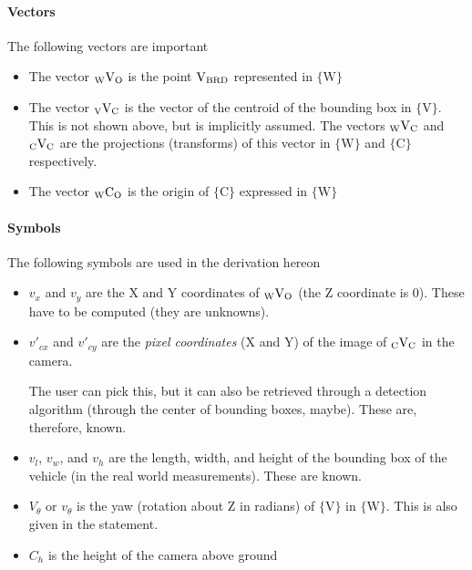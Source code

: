 \paragraph*{Vectors}

The following vectors are important

\begin{itemize}
    \item The vector $_{\textrm{W}}\textup{V}_{\textup{O}}$ is the point $\textup{V}_{\textup{BRD}}$ represented in $\{\textrm{W}\}$
    \item The vector $_{\textrm{V}}\textup{V}_{\textup{C}}$ is the vector of the centroid of the bounding box in $\{\textrm{V}\}$. This is not shown above, but is implicitly assumed. The vectors $_{\textrm{W}}\textup{V}_{\textup{C}}$ and $_{\textrm{C}}\textup{V}_{\textup{C}}$ are the projections (transforms) of this vector in $\{\textrm{W}\}$ and $\{\textrm{C}\}$ respectively.
    \item The vector $_{\textrm{W}}\textup{C}_{\textup{O}}$ is the origin of $\{\textrm{C}\}$ expressed in $\{\textrm{W}\}$
\end{itemize}

\paragraph*{Symbols}

The following symbols are used in the derivation hereon

\begin{itemize}
    \item $v_x$ and $v_y$ are the X and Y coordinates of $_{\textrm{W}}\textup{V}_{\textup{O}}$ (the Z coordinate is 0). These have to be computed (they are unknowns).

    \item $v'_{cx}$ and $v'_{cy}$ are the \emph{pixel coordinates} (X and Y) of the image of $_{\textrm{C}}\textup{V}_{\textup{C}}$ in the camera.
    
    The user can pick this, but it can also be retrieved through a detection algorithm (through the center of bounding boxes, maybe). These are, therefore, known.

    \item $v_l$, $v_w$, and $v_h$ are the length, width, and height of the bounding box of the vehicle (in the real world measurements). These are known.

    \item $V_\theta$ or $v_\theta$ is the yaw (rotation about Z in radians) of $\{\textrm{V}\}$ in $\{\textrm{W}\}$. This is also given in the statement.

    \item $C_h$ is the height of the camera above ground
\end{itemize}

